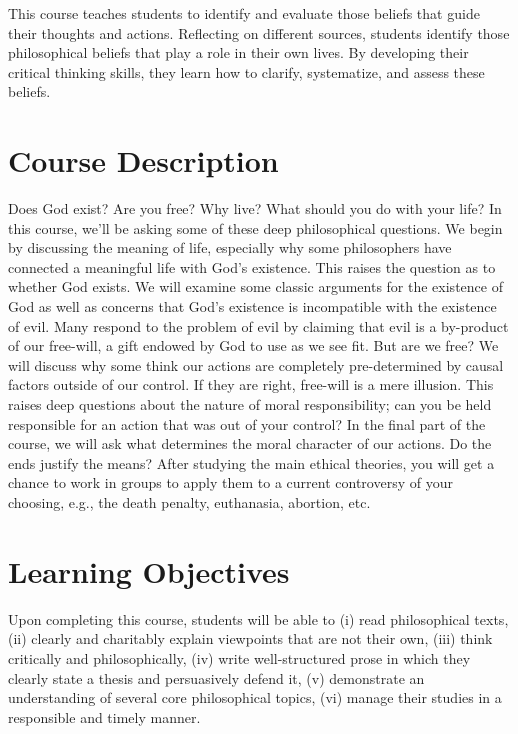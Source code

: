 \documentclass[article,oneside]{memoir}
\begin{document}
This course teaches students to identify and evaluate those beliefs that guide their thoughts and actions. Reflecting on different sources, students identify those philosophical beliefs that play a role in their own lives. By developing their critical thinking skills, they learn how to clarify, systematize, and assess these beliefs. 

\section{Course Description}

Does God exist? Are you free? Why live? What should you do with your life?  In this course, we'll be asking some of these deep philosophical questions. We begin by discussing the meaning of life, especially why some philosophers have connected a meaningful life with God's existence. This raises the question as to whether God exists. We will examine some classic arguments for the existence of God as well as concerns that God's existence is incompatible with the existence of evil. Many respond to the problem of evil by claiming that evil is a by-product of our free-will, a gift endowed by God to use as we see fit. But are we free? We will discuss why some think our actions are completely pre-determined by causal factors outside of our control. If they are right, free-will is a mere illusion. This raises deep questions about the nature of moral responsibility; can you be held responsible for an action that was out of your control? In the final part of the course, we will ask what determines the moral character of our actions. Do the ends justify the means? After studying the main ethical theories, you will get a chance to work in groups to apply them to a current controversy of your choosing, e.g., the death penalty, euthanasia, abortion, etc. 

\section{Learning Objectives}

Upon completing this course, students will be able to (i) read
philosophical texts, (ii) clearly and charitably explain viewpoints that
are not their own, (iii) think critically and philosophically, (iv)
write well-structured prose in which they clearly state a thesis and
persuasively defend it, (v) demonstrate an understanding of several core
philosophical topics, (vi) manage their studies in a responsible and timely manner. 
\end{document}

